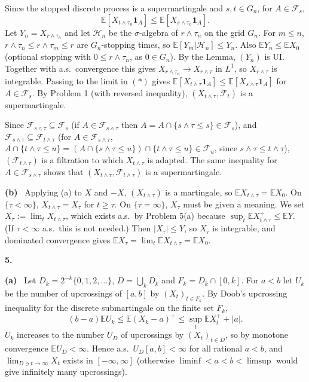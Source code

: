 \documentclass[11pt,a4paper]{article}
\newcommand{\E}{\mathbb{E}}
\newcommand{\F}{\mathcal{F}}
\newcommand{\Hc}{\mathcal{H}}
\newcommand{\1}{\mathbf{1}}
\newcommand{\prob}[1]{\par\medskip\noindent\textbf{#1}\quad}
\newcommand{\sub}[1]{\par\smallskip\noindent\textbf{#1}\ }
\begin{document}
Since the stopped discrete process is a supermartingale and $s,t\in G_n$, for $A\in\F_s$,
\[
\E[X_{t\wedge\tau_n}\1_A]\le\E[X_{s\wedge\tau_n}\1_A].\tag{$*$}
\]
Let $Y_n=X_{r\wedge\tau_n}$ and let $\Hc_n$ be the $\sigma$-algebra of $r\wedge\tau_n$ on the grid $G_n$. For $m\le n$, $r\wedge\tau_n\le
r\wedge\tau_m\le r$ are $G_n$-stopping times, so $\E[Y_m|\Hc_n]\le Y_n$. Also $\E Y_n\le\E X_0$ (optional stopping with $0\le r\wedge\tau_n$, as $0\in G_n$). By the Lemma,
$(Y_n)$ is UI. Together with a.s.\ convergence this gives $X_{r\wedge\tau_n}\to X_{r\wedge\tau}$ in $L^1$, so
$X_{r\wedge\tau}$ is integrable. Passing to the limit in $(*)$ gives
$\E[X_{t\wedge\tau}\1_A]\le\E[X_{s\wedge\tau}\1_A]$ for $A\in\F_s$. By Problem 1 (with reversed inequality),
$(X_{t\wedge\tau},\F_t)$ is a supermartingale.

Since $\F_{s\wedge\tau}\subseteq\F_s$ (if $A\in\F_{s\wedge\tau}$ then $A=A\cap\{s\wedge\tau\le s\}\in\F_s$),
and $\F_{s\wedge\tau}\subseteq\F_{t\wedge\tau}$ (for $A\in\F_{s\wedge\tau}$,
$A\cap\{t\wedge\tau\le u\}=(A\cap\{s\wedge\tau\le u\})\cap\{t\wedge\tau\le u\}\in\F_u$, since $s\wedge\tau\le t\wedge\tau$),
$(\F_{t\wedge\tau})$ is a filtration to which $X_{t\wedge\tau}$ is adapted. The same inequality for
$A\in\F_{s\wedge\tau}$ shows that $(X_{t\wedge\tau},\F_{t\wedge\tau})$ is a supermartingale.

\sub{(b)} Applying (a) to $X$ and $-X$, $(X_{t\wedge\tau})$ is a martingale, so $\E X_{t\wedge\tau}=\E X_0$.
On $\{\tau<\infty\}$, $X_{t\wedge\tau}=X_\tau$ for $t\ge\tau$. On $\{\tau=\infty\}$, $X_\tau$ must be given a meaning. We
set $X_\tau:=\lim_tX_{t\wedge\tau}$, which exists a.s.\ by Problem 5(a) because $\sup_t\E X_{t\wedge\tau}^+\le\E Y$. (If
$\tau<\infty$ a.s.\ this is not needed.) Then $|X_\tau|\le Y$, so $X_\tau$ is integrable, and dominated convergence gives
$\E X_\tau=\lim_t\E X_{t\wedge\tau}=\E X_0$.

\prob{5.}
\sub{(a)} Let $D_k=2^{-k}\{0,1,2,\dots\}$, $D=\bigcup_kD_k$ and $F_k=D_k\cap[0,k]$. For $a<b$ let
$U_k$ be the number of upcrossings of $[a,b]$ by $(X_t)_{t\in F_k}$. By Doob's upcrossing inequality for the
discrete submartingale on the finite set $F_k$,
\[(b-a)\E U_k\le\E(X_k-a)^+\le\sup_t\E X_t^++|a|.\]
$U_k$ increases to the number $U_D$ of upcrossings by $(X_t)_{t\in D}$, so by monotone convergence $\E U_D<\infty$. Hence a.s.\
$U_D[a,b]<\infty$ for all rational $a<b$, and $\lim_{D\ni t\to\infty}X_t$ exists in $[-\infty,\infty]$ (otherwise
$\liminf<a<b<\limsup$ would give infinitely many upcrossings).
\end{document}
